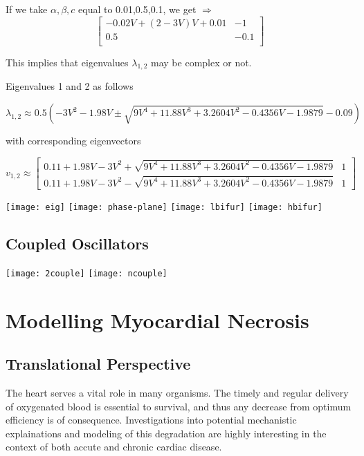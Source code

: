 \documentclass[11pt]{report}
\begin{document}
If we take $\alpha,\beta,c$ equal to 0.01,0.5,0.1, we get $\Rightarrow $
$$
\begin{bmatrix}
    −0.02V+(2−3V)V+0.01 & -1 \\
    0.5 & -0.1 \\    
\end{bmatrix}
$$

This implies that eigenvalues $\lambda_{1,2}$ may be complex or not. 

Eigenvalues 1 and 2 as follows

$$ \lambda_{1,2} \approx 0.5(-3V^2 - 1.98V \pm \sqrt{ 9V^4 + 11.88 V^3 + 3.2604 V^2 - 0.4356 V - 1.9879 } - 0.09) $$

with corresponding eigenvectors

$$ v_{1,2} \approx \begin{bmatrix} 0.11 + 1.98V - 3V^2 + \sqrt{ 9V^4 + 11.88 V^3 + 3.2604 V^2 - 0.4356 V - 1.9879} & 1 \\ 0.11 + 1.98V - 3V^2 - \sqrt{ 9V^4 + 11.88 V^3 + 3.2604 V^2 - 0.4356 V - 1.9879} & 1 \end{bmatrix} $$

\texttt{[image: eig]}
\texttt{[image: phase-plane]}
\texttt{[image: lbifur]}
\texttt{[image: hbifur]}




\section{Coupled Oscillators} %
\label{sub:coupled_oscillators}

\texttt{[image: 2couple]}
\texttt{[image: ncouple]}





\chapter{Modelling Myocardial Necrosis} 


\section{Translational Perspective} %

The heart serves a vital role in many organisms. The timely and regular delivery of oxygenated blood is essential to survival, and thus any decrease from optimum efficiency is of consequence. Investigations into potential mechanistic explainations and modeling of this degradation are highly interesting in the context of both accute and chronic cardiac disease.
\end{document}
